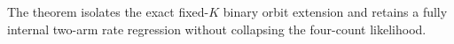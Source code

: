 The theorem isolates the exact fixed-\(K\) binary orbit extension and retains a fully internal two-arm rate regression without collapsing the four-count likelihood.